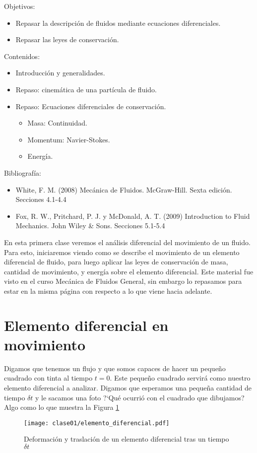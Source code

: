 \begin{framed}

Objetivos:
\begin{itemize}
    \item Repasar la descripción de fluidos mediante ecuaciones diferenciales.
    \item Repasar las leyes de conservación.
\end{itemize}

Contenidos:
\begin{itemize}
    \item Introducción y generalidades.
    \item Repaso: cinemática de una partícula de fluido.
    \item Repaso: Ecuaciones diferenciales de conservación. 
    \begin{itemize}
        \item Masa: Continuidad.
        \item Momentum: Navier-Stokes.
        \item Energía.
    \end{itemize}
\end{itemize}

Bibliografía:
\begin{itemize}
    \item White, F. M. (2008) Mecánica de Fluidos. McGraw-Hill. Sexta edición. Secciones 4.1-4.4
    \item Fox, R. W., Pritchard, P. J. y McDonald, A. T. (2009) Introduction to Fluid Mechanics. John Wiley \& Sons. Secciones 5.1-5.4
\end{itemize}
\end{framed}

En esta primera clase veremos el análisis diferencial del movimiento de un fluido. 
Para esto, iniciaremos viendo como se describe el movimiento de un elemento diferencial de fluido, para luego aplicar las leyes de conservación de masa, cantidad de movimiento, y energía sobre el elemento diferencial.
 Este material fue visto en el curso Mecánica de Fluidos General, sin embargo lo repasamos para estar en la misma página con respecto a lo que viene hacia adelante.

\section*{Elemento diferencial en movimiento}
Digamos que tenemos un flujo y que somos capaces de hacer un pequeño cuadrado con tinta al tiempo $t=0$.
Este pequeño cuadrado servirá como nuestro elemento diferencial a analizar.
Digamos que esperamos una pequeña cantidad de tiempo $\delta t$ y le sacamos una foto \mbox{?`}Qué ocurrió con el cuadrado que dibujamos? Algo como lo que muestra la Figura \ref{fig:elemento_diferencial}
%
\begin{figure}[h!]
\centering
\texttt{[image: clase01/elemento\_diferencial.pdf]}
\caption{Deformación y traslación de un elemento diferencial tras un tiempo $\delta t$}
\label{fig:elemento_diferencial}
\end{figure}

